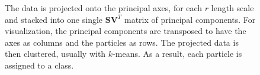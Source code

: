 \begin{figure}[!htb]

\caption[Clustering]{The data is projected onto the principal axes, for each $r$ length scale and stacked into one single $\bm{SV}^T$ matrix of principal components. For visualization, the principal components are transposed to have the axes as columns and the particles as rows. The projected data is then clustered, usually with $k$-means. As a result, each particle is assigned to a class.}
\label{fig:cluster}
\end{figure}
